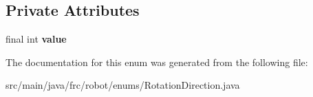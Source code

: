 \subsection*{Private Attributes}
\begin{DoxyCompactItemize}
\item 
\mbox{\label{enumfrc_1_1robot_1_1enums_1_1_rotation_direction_a442d8b0b5410f57a5d509dccd17cb9ae}} 
final int {\bfseries value}
\end{DoxyCompactItemize}


The documentation for this enum was generated from the following file\+:\begin{DoxyCompactItemize}
\item 
src/main/java/frc/robot/enums/Rotation\+Direction.\+java\end{DoxyCompactItemize}
